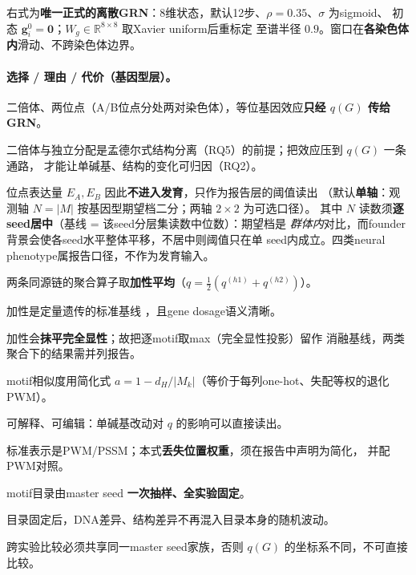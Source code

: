 右式为\textbf{唯一正式的离散GRN}：8维状态，默认12步、$\rho=0.35$、$\sigma$ 为sigmoid、
初态 $\mathbf g_i^{0}=\mathbf 0$；$W_g\in\mathbb R^{8\times8}$ 取Xavier uniform后重标定
至谱半径 $0.9$。窗口在\textbf{各染色体内}滑动、不跨染色体边界。

\paragraph{选择 / 理由 / 代价（基因型层）。}

\begin{description}
  \item 二倍体、两位点（A/B位点分处两对染色体），等位基因效应\textbf{只经 $q(G)$ 传给 GRN}。
  \item 二倍体与独立分配是孟德尔式结构分离（RQ5）的前提；把效应压到 $q(G)$ 一条通路，
        才能让单碱基、结构的变化可归因（RQ2）。
  \item[代价] 位点表达量 $E_A,E_B$ 因此\textbf{不进入发育}，只作为报告层的阈值读出
        （默认\textbf{单轴}：观测轴 $N=|M|$ 按基因型期望档二分；两轴 $2\times2$ 为可选口径）。
        其中 $N$ 读数须\textbf{逐seed居中}（基线 = 该seed分层集读数中位数）：期望档是
        \emph{群体内}对比，而founder背景会使各seed水平整体平移，不居中则阈值只在单
        seed内成立。四类neural phenotype属报告口径，不作为发育输入。
\end{description}

\begin{description}
  \item 两条同源链的聚合算子取\textbf{加性平均}（$q=\tfrac12(q^{(h1)}+q^{(h2)})$）。
  \item 加性是定量遗传的标准基线 \citep{bib138_fisher1918}，且gene dosage语义清晰。
  \item[代价] 加性会\textbf{抹平完全显性}；故把逐motif取max（完全显性投影）留作
        消融基线，两类聚合下的结果需并列报告。
\end{description}

\begin{description}
  \item motif相似度用简化式 $a=1-d_H/|M_k|$（等价于每列one-hot、失配等权的退化PWM）。
  \item 可解释、可编辑：单碱基改动对 $q$ 的影响可以直接读出。
  \item[代价] 标准表示是PWM/PSSM；本式\textbf{丢失位置权重}，须在报告中声明为简化，
        并配PWM对照。
\end{description}

\begin{description}
  \item motif目录由master seed \textbf{一次抽样、全实验固定}。
  \item 目录固定后，DNA差异、结构差异不再混入目录本身的随机波动。
  \item[代价] 跨实验比较必须共享同一master seed家族，否则 $q(G)$ 的坐标系不同，不可直接比较。
\end{description}

